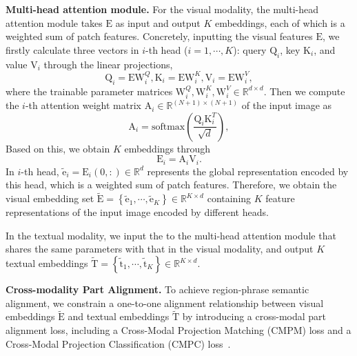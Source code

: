 \documentclass{article}
\begin{document}
\par 
\textbf{Multi-head attention module.} 
For the visual modality, the multi-head attention module takes $\bm{\mathrm{E}}$ as input and output ${K}$ embeddings, each of which is a weighted sum of patch features. 
Concretely, inputting the visual features $\bm{\mathrm{E}}$, we firstly calculate three vectors in $i$-th head ($i=1,\cdots,K$): query $\bm{\mathrm{Q}}_i$, key $\bm{\mathrm{K}}_i$, and value $\bm{\mathrm{V}}_i$ through the linear projections,
\begin{equation}
\bm{\mathrm{Q}}_i = \bm{\mathrm{E}}\bm{\mathrm{W}}_i^Q, \bm{\mathrm{K}}_i = \bm{\mathrm{E}}\bm{\mathrm{W}}_i^K, \mathrm{V}_i = \bm{\mathrm{E}}\bm{\mathrm{W}}_i^V, 
\end{equation}
where the trainable parameter matrices $\bm{\mathrm{W}}_i^Q, \bm{\mathrm{W}}_i^K,\bm{\mathrm{W}}_i^V\in \mathbb{R}^{d\times d}$. Then we compute the $i$-th attention weight matrix $\bm{\mathrm{A}}_i \in \mathbb{R}^{(N+1)\times (N+1)}$ of the input image as
\begin{equation}
    \bm{\mathrm{A}}_i=\mathrm{softmax}(\frac{\bm{\mathrm{Q}}_i\bm{\mathrm{K}}_i^T}{\sqrt{d}}),
\end{equation}
Based on this, we obtain $K$ embeddings through
\begin{equation}
    \bm{\mathrm{E}}_i=\bm{\mathrm{A}}_i\bm{\mathrm{V}}_i.
\end{equation}
In $i$-th head, $\bm{\tilde{\mathrm{e}}}_i=\bm{{\mathrm{E}}}_i(0,:)\in \mathbb{R}^d$ represents the global representation encoded by this head, which is a weighted sum of patch features. Therefore, we obtain the visual embedding set $\bm{\tilde{\mathrm{E}}}=\left\{\bm{\tilde{\mathrm{e}}}_1,\cdots,\bm{\tilde{\mathrm{e}}}_K\right\}\in \mathbb{R}^{K \times d}$ containing $K$ feature representations of the input image encoded by different heads.\par

In the textual modality, we input the  to the multi-head attention module that shares the same parameters with that in the visual modality, and output $K$ textual embeddings
 $\bm{\tilde{\mathrm{T}}}=\left\{\bm{\tilde{\mathrm{t}}}_1,\cdots,\bm{\tilde{\mathrm{t}}}_K\right\}\in \mathbb{R}^{K \times d}$.\par
\textbf{Cross-modality Part Alignment.} 
To achieve region-phrase semantic alignment, we constrain a one-to-one alignment relationship between visual embeddings $\bm{\tilde{\mathrm{E}}}$ and textual embeddings $\tilde{\bm{\mathrm{T}}}$ by introducing a cross-modal part alignment loss, including a Cross-Modal Projection Matching (CMPM) loss and a Cross-Modal Projection Classification (CMPC) loss~\cite{zhang2018deep}.\par 
\end{document}
